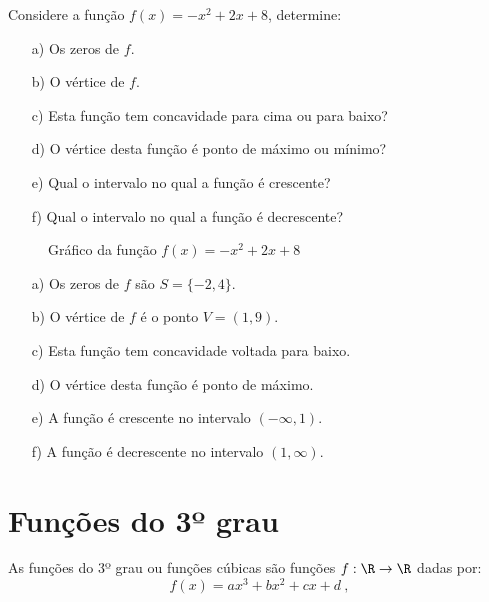 \begin{exem}
Considere a função $f(x)= -x^2 + 2x + 8$, determine:
\begin{enumerate}
\item [a)] Os zeros de $f$.
\item [b)] O vértice de $f$.
\item [c)] Esta função tem concavidade para cima ou para baixo?
\item [d)] O vértice desta função é ponto de máximo ou mínimo?
\item [e)] Qual o intervalo no qual a função é crescente?
\item [f)] Qual o intervalo no qual a função é decrescente?
\end{enumerate}
  \begin{figure}[H]
  \centering
   \caption{Gráfico da função $f(x)= -x^2 + 2x + 8$}
  \end{figure}
\end{exem}

\begin{resol}
\begin{enumerate}
\item [a)] Os zeros de $f$ são $S= \{-2, 4\}$.
\item [b)] O vértice de $f$ é o ponto $V= (1,9)$.
\item [c)] Esta função tem concavidade voltada para baixo.
\item [d)] O vértice desta função é ponto de máximo.
\item [e)] A função é crescente no intervalo $(-\infty, 1)$.
\item [f)] A função é decrescente no intervalo $(1, \infty)$.
\end{enumerate}
\end{resol}

 \section{Funções do 3º grau}
 As funções do 3º grau ou funções cúbicas são funções $f: \R \rightarrow \R$ dadas por:
\begin{equation}
f(x)= ax^3 + bx^2 + cx + d \ ,
\end{equation}


